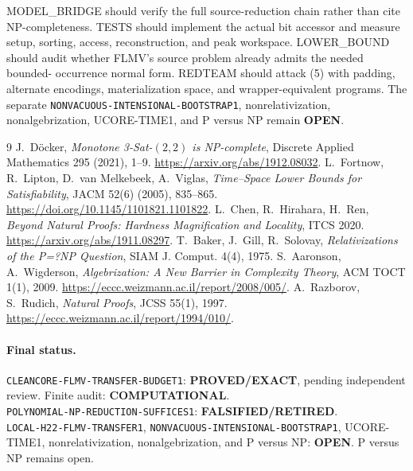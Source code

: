 \documentclass[11pt]{article}
\newcommand{\EXACT}{\textbf{PROVED/EXACT}}
\newcommand{\OPEN}{\textbf{OPEN}}
\newcommand{\RETIRED}{\textbf{FALSIFIED/RETIRED}}
\newcommand{\COMP}{\textbf{COMPUTATIONAL}}
\begin{document}
MODEL\_BRIDGE should verify the full source-reduction chain rather than cite
NP-completeness.  TESTS should implement the actual bit accessor and measure
setup, sorting, access, reconstruction, and peak workspace.  LOWER\_BOUND
should audit whether FLMV's source problem already admits the needed bounded-
occurrence normal form.  REDTEAM should attack (5) with padding, alternate
encodings, materialization space, and wrapper-equivalent programs.  The
separate \texttt{NONVACUOUS-INTENSIONAL-BOOTSTRAP1}, nonrelativization,
nonalgebrization, UCORE-TIME1, and P versus NP remain \OPEN.

\begin{thebibliography}{9}
 J.~D\"ocker,
\emph{Monotone 3-Sat-$(2,2)$ is NP-complete}, Discrete Applied Mathematics
295 (2021), 1--9. \url{https://arxiv.org/abs/1912.08032}.
 L.~Fortnow, R.~Lipton, D.~van Melkebeek, A.~Viglas,
\emph{Time--Space Lower Bounds for Satisfiability}, JACM 52(6) (2005),
835--865. \url{https://doi.org/10.1145/1101821.1101822}.
 L.~Chen, R.~Hirahara, H.~Ren,
\emph{Beyond Natural Proofs: Hardness Magnification and Locality},
ITCS 2020. \url{https://arxiv.org/abs/1911.08297}.
 T.~Baker, J.~Gill, R.~Solovay,
\emph{Relativizations of the P=?NP Question}, SIAM J. Comput. 4(4), 1975.
 S.~Aaronson, A.~Wigderson,
\emph{Algebrization: A New Barrier in Complexity Theory}, ACM TOCT 1(1),
2009. \url{https://eccc.weizmann.ac.il/report/2008/005/}.
 A.~Razborov, S.~Rudich,
\emph{Natural Proofs}, JCSS 55(1), 1997.
\url{https://eccc.weizmann.ac.il/report/1994/010/}.
\end{thebibliography}

\paragraph{Final status.}
\texttt{CLEANCORE-FLMV-TRANSFER-BUDGET1}: \EXACT, pending independent
review.  Finite audit: \COMP.\\
\texttt{POLYNOMIAL-NP-REDUCTION-SUFFICES1}: \RETIRED.\\
\texttt{LOCAL-H22-FLMV-TRANSFER1},
\texttt{NONVACUOUS-INTENSIONAL-BOOTSTRAP1}, UCORE-TIME1,
nonrelativization, nonalgebrization, and P versus NP: \OPEN.
P versus NP remains open.

\end{document}
